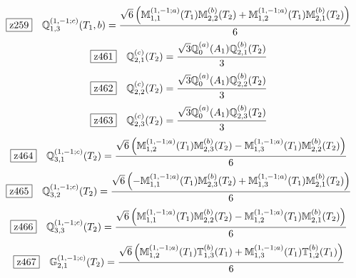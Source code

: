 \documentclass[fleqn,10pt,landscape]{jsarticle}
\begin{document}
\begin{dmath*}
\hspace*{3mm}\fbox{z259}\quad \mathbb{Q}_{1,3}^{(1,-1;c)}(T_{1},b)=\frac{\sqrt{6} \left(\mathbb{M}_{1,1}^{(1,-1;a)}(T_{1}) \mathbb{M}_{2,2}^{(b)}(T_{2}) + \mathbb{M}_{1,2}^{(1,-1;a)}(T_{1}) \mathbb{M}_{2,1}^{(b)}(T_{2})\right)}{6}
\end{dmath*}
\begin{dmath*}
\hspace*{3mm}\fbox{z461}\quad \mathbb{Q}_{2,1}^{(c)}(T_{2})=\frac{\sqrt{3} \mathbb{Q}_{0}^{(a)}(A_{1}) \mathbb{Q}_{2,1}^{(b)}(T_{2})}{3}
\end{dmath*}
\begin{dmath*}
\hspace*{3mm}\fbox{z462}\quad \mathbb{Q}_{2,2}^{(c)}(T_{2})=\frac{\sqrt{3} \mathbb{Q}_{0}^{(a)}(A_{1}) \mathbb{Q}_{2,2}^{(b)}(T_{2})}{3}
\end{dmath*}
\begin{dmath*}
\hspace*{3mm}\fbox{z463}\quad \mathbb{Q}_{2,3}^{(c)}(T_{2})=\frac{\sqrt{3} \mathbb{Q}_{0}^{(a)}(A_{1}) \mathbb{Q}_{2,3}^{(b)}(T_{2})}{3}
\end{dmath*}
\begin{dmath*}
\hspace*{3mm}\fbox{z464}\quad \mathbb{Q}_{3,1}^{(1,-1;c)}(T_{2})=\frac{\sqrt{6} \left(\mathbb{M}_{1,2}^{(1,-1;a)}(T_{1}) \mathbb{M}_{2,3}^{(b)}(T_{2}) - \mathbb{M}_{1,3}^{(1,-1;a)}(T_{1}) \mathbb{M}_{2,2}^{(b)}(T_{2})\right)}{6}
\end{dmath*}
\begin{dmath*}
\hspace*{3mm}\fbox{z465}\quad \mathbb{Q}_{3,2}^{(1,-1;c)}(T_{2})=\frac{\sqrt{6} \left(- \mathbb{M}_{1,1}^{(1,-1;a)}(T_{1}) \mathbb{M}_{2,3}^{(b)}(T_{2}) + \mathbb{M}_{1,3}^{(1,-1;a)}(T_{1}) \mathbb{M}_{2,1}^{(b)}(T_{2})\right)}{6}
\end{dmath*}
\begin{dmath*}
\hspace*{3mm}\fbox{z466}\quad \mathbb{Q}_{3,3}^{(1,-1;c)}(T_{2})=\frac{\sqrt{6} \left(\mathbb{M}_{1,1}^{(1,-1;a)}(T_{1}) \mathbb{M}_{2,2}^{(b)}(T_{2}) - \mathbb{M}_{1,2}^{(1,-1;a)}(T_{1}) \mathbb{M}_{2,1}^{(b)}(T_{2})\right)}{6}
\end{dmath*}
\begin{dmath*}
\hspace*{3mm}\fbox{z467}\quad \mathbb{G}_{2,1}^{(1,-1;c)}(T_{2})=\frac{\sqrt{6} \left(\mathbb{M}_{1,2}^{(1,-1;a)}(T_{1}) \mathbb{T}_{1,3}^{(b)}(T_{1}) + \mathbb{M}_{1,3}^{(1,-1;a)}(T_{1}) \mathbb{T}_{1,2}^{(b)}(T_{1})\right)}{6}
\end{dmath*}
\end{document}
